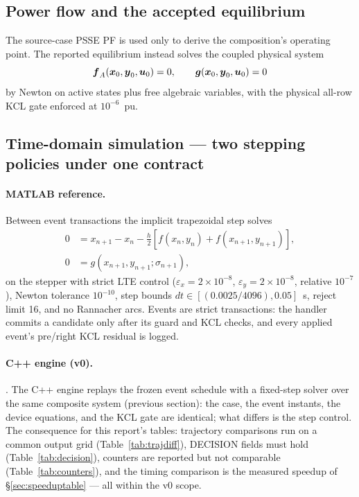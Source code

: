 \subsection{Power flow and the accepted equilibrium}

The source-case PSSE PF is used only to derive the composition's operating
point.  The reported equilibrium instead solves the coupled physical system
\[
\boldsymbol{f}_A(\boldsymbol{x}_0,\boldsymbol{y}_0,\boldsymbol{u}_0)=0,\qquad
\boldsymbol{g}(\boldsymbol{x}_0,\boldsymbol{y}_0,\boldsymbol{u}_0)=0
\]
by Newton on active states plus free algebraic variables, with the physical
all-row KCL gate enforced at $10^{-6}$~pu.

\subsection{Time-domain simulation --- two stepping policies under one contract}

\paragraph{MATLAB reference.}
Between event transactions the implicit trapezoidal step solves
\begin{align}
0&=x_{n+1}-x_n-\frac{h}{2}\left[f(x_n,y_n)+f(x_{n+1},y_{n+1})\right],\\
0&=g(x_{n+1},y_{n+1};\sigma_{n+1}),
\end{align}
on the  stepper with strict LTE control
($\varepsilon_x=2\times10^{-8}$, $\varepsilon_y=2\times10^{-8}$, relative
$10^{-7}$), Newton tolerance $10^{-10}$, step bounds
$dt\in[(0.0025/4096),0.05]$~s, reject limit 16, and no Rannacher arcs.
Events are strict transactions: the handler commits a candidate only after
its guard and KCL checks, and every applied event's pre/right KCL residual
is logged.

\paragraph{C++ engine (v0).}
\intmodes{} \vscopecite.  The C++ engine replays the frozen event schedule
with a fixed-step solver over the same composite system (previous section):
the case, the event instants, the device equations, and the KCL gate are
identical; what differs is the step control.  The consequence for this
report's tables: trajectory comparisons run on a common output grid
(Table~\ref{tab:trajdiff}), DECISION fields must hold
(Table~\ref{tab:decision}), counters are reported but not comparable
(Table~\ref{tab:counters}), and the timing comparison is the measured
speedup of \S\ref{sec:speeduptable} --- all within the v0 scope.
